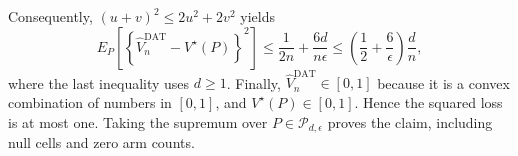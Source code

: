 Consequently, \((u+v)^2\le2u^2+2v^2\) yields
\[
 E_P\!\left[
  \left\{\widehat V_n^{\mathrm{DAT}}-V^\star(P)\right\}^2
 \right]
 \le \frac1{2n}+\frac{6d}{n\epsilon}
 \le \left(\frac12+\frac6\epsilon\right)\frac dn,
\]
where the last inequality uses \(d\ge1\).  Finally, \(\widehat V_n^{\mathrm{DAT}}\in[0,1]\) because it is a convex combination of numbers in \([0,1]\), and \(V^\star(P)\in[0,1]\).  Hence the squared loss is at most one.  Taking the supremum over \(P\in\mathcal P_{d,\epsilon}\) proves the claim, including null cells and zero arm counts.